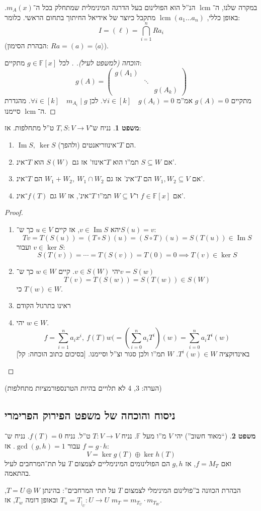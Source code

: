 \documentclass[a4paper]{article}
\newcommand\ml    {\ell}
\newcommand\ra    {\rangle}
\newcommand\la    {\langle}
\DeclareMathOperator\Img   {Im}
\DeclareMathOperator{\lcm}     {lcm}
\newcommand\F         {\mathbb{F}}
\newcommand\co        {\colon}
\newcommand\pms[1]    {\begin{pmatrix}
		#1
\end{pmatrix}}
\newcommand\cl [1]    {\left ( #1 \right )}
\theoremstyle{definition}
\newtheorem{Theorem}{משפט}
\newcommand\theo  [1] {\begin{Theorem}#1\end{Theorem}}
\begin{document}
	במקרה שלנו, ה־$\lcm$ הנ''ל הוא הפולינום בעל הדרגה המינימלית שמתחלק בכל ה־$m_A(x)$. באופן כללי, $\lcm(a_1 \dots a_n)$ מתקבל כיוצר של אידיאל החיתוך בתחום הראשי. כלומר: 
	\[ I = (\ml) = \bigcap_{i = 1}^{n}R a_i \]
	(הבהרת הסימון: $ Ra = (a) = \la a \ra $). 
	\begin{proof}[הוכחה (למשפט לעיל). ]
		לכל $g \in \F[x]$ מתקיים: 
		\[ g(A) = \pms{g(A_1) & & \\ & \ddots & \\ && g(A_k)} \]
		מתקיים $g(A) = 0$ אמ''מ $\forall i \in [k] \quad g(A_i) =0$. לכן $\forall i \in [k] \quad m_{A_i} \mid g$. מהגדרת ה־$\lcm$ סיימנו. 
	\end{proof}
	
	\theo{נניח ש־$T, S \co V \to V$ ט''ל מתחלפות. אז: 
		\begin{enumerate}
			\item $\Img S, \ \ker S$ הם $T$־אינווריאנטים (ולהפך). 
			\item אם $S \subseteq W$ תמ''ו הוא $T$־אינוו' אז גם $S(W)$ הוא $T$־אינ'. 
			\item אם $W_1, W_2 \subseteq V$ הם $T$־אינ' אז גם $W_1 + W_2, \ W_1 \cap W_2$ הם $T$־אינ'. 
			\item אם $f \in \F[x]$ ו־$W \subseteq V$ תמ''ו $T$־אינ', אז $W$ גם $f(T)$־אינ'. 
	\end{enumerate}}
	\begin{proof}\,
		\begin{enumerate}
			\item יהא $v \in \Img S$, אז קיים $u \in V$ כך ש־$S(u) = v$: 
			\[ Tv = T(S(u)) = (T \circ S)(u) = (S \circ T)(u) = S(T(u)) \in \Img S \]
			ועבור $v \in \ker S$: 
			\[ S(T(v)) = \cdots = T(S(v)) = T(0) = 0 \implies T(v) \in \ker S \]
			\item יהי $v \in S(W)$. קיים $w \in W$ כך ש־$v = S(w)$
			\[ T(v) = T(S(w)) = S(T(w)) \in S(W) \]
			כי $T(w) \in W$. 
			\item ראינו בתרגול הקודם
			\item יהי $w \in W$. 
			\[ f = \sum_{i = 1}^{n}a_ix^{i}, \ f(T)w( = \cl{\sum_{i = 0}^{n}a_iT^{i}}(w) = \sum_{i = 0}^{n}a_iT^{i}(w) \]
			באינדוקציה $T^{i}(w) \in W$. $W$ תמ''ו ולכן סגור וצ''ל וסיימנו. [בסיכום כתוב הוכחה: קל]
		\end{enumerate}
	\end{proof}
	(הערה: 3, 4 לא תלויים בהיות הטרנספורמציות מתחלפות)
	
	\subsection{ניסוח והוכחה של משפט הפירוק הפרימרי}
	\theo{(``מאוד חשוב'') יהי $V$ מ''ו מעל $\F$. נניח $T \co V \to V$ ט''ל. נניח $f(T) = 0$. נניח ש־$f = g \cdot h$ עבור $\gcd(g, h) = 1$. אז: 
		\[ V = \ker g(T) \oplus \ker h(T) \]
		ואם $f = M_T$, אז $g, h$ הם הפולינומים המינימליים לצמצום $T$ על תת־המרחבים לעיל בהתאמה. 
	}
	הבהרת הכוונה ב''פולינום המינימלי לצמצום $T$ על תתי המרחבים'': בהינתן $T = U \oplus W$, $T_u = T_{\mid_U} \co U \to U$ ובאופן דומה $T_w$, אז $m_T = m_{T_U} \cdot m_{T_W}$. 
	
\end{document}
